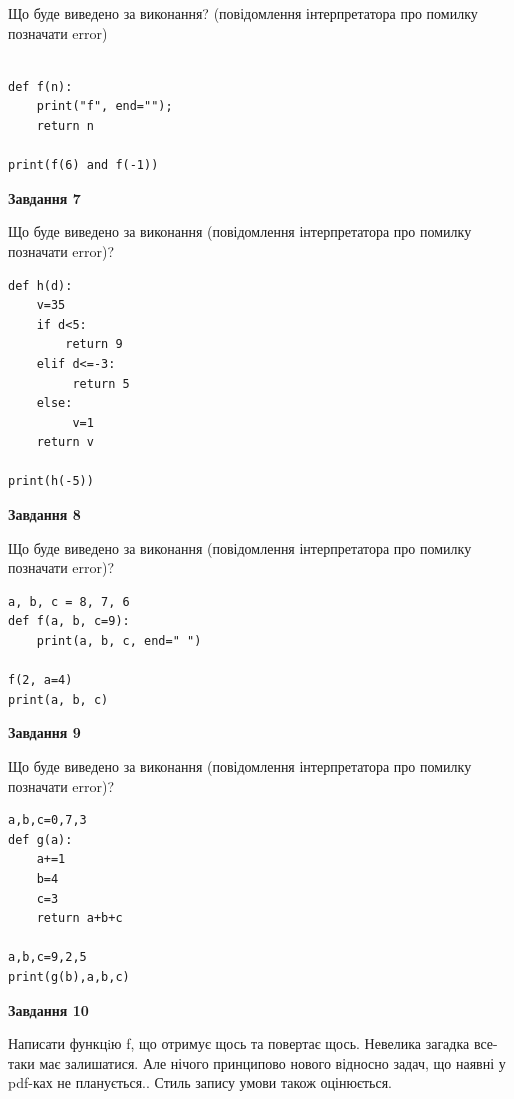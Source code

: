 \documentclass[12pt, ukrainian]{article}
\begin{document}
{\begin {large}
Що буде виведено за виконання? (повідомлення інтерпретатора про помилку позначати error)\par
\begin{verbatim}

def f(n):
    print("f", end="");
    return n

print(f(6) and f(-1))
\end{verbatim}

{\begin {center}\textbf{Завдання 7}\end {center}}

Що буде виведено за виконання (повідомлення інтерпретатора про помилку позначати error)?\par
\begin{verbatim}
def h(d):
    v=35
    if d<5: 
        return 9
    elif d<=-3:
         return 5
    else:
         v=1
    return v

print(h(-5))
\end{verbatim}

{\begin {center}\textbf{Завдання 8}\end {center}}

Що буде виведено за виконання (повідомлення інтерпретатора про помилку позначати error)?\par
\begin{verbatim}
a, b, c = 8, 7, 6
def f(a, b, c=9):
    print(a, b, c, end=" ")

f(2, a=4)
print(a, b, c)
\end{verbatim}

{\begin {center}\textbf{Завдання 9}\end {center}}

Що буде виведено за виконання (повідомлення інтерпретатора про помилку позначати error)?\par
\begin{verbatim}
a,b,c=0,7,3
def g(a):
    a+=1
    b=4
    c=3
    return a+b+c

a,b,c=9,2,5
print(g(b),a,b,c)
\end{verbatim}

{\begin {center}\textbf{Завдання 10}\end {center}}


Написати функцiю f, що отримує щось та повертає щось. Невелика загадка все-таки має залишатися. Але нічого принципово нового відносно задач, що наявні у pdf-ках не планується.. Стиль запису умови також оцінюється.\par
\end {large}}
\newpage
\end{document}
